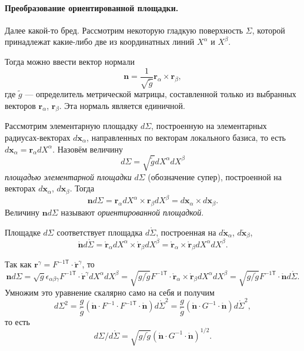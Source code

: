 \paragraph{Преобразование ориентированной площадки.} Далее какой-то бред.
Рассмотрим некоторую гладкую поверхность $ \Sigma $, которой принадлежат
какие-либо две из координатных линий $ X^\alpha $ и $ X^\beta $.

Тогда можно ввести вектор нормали  
\[
  \mathbf{n} = \frac{1}{\sqrt{\tilde{g}}} \mathbf{r}_\alpha \times
  \mathbf{r}_\beta,
\]
где $ \tilde g $ --- определитель метрической матрицы, составленной только из
выбранных векторов $ \mathbf{r}_\alpha $, $ \mathbf{r}_\beta $. Эта нормаль
является единичной.

Рассмотрим элементарную площадку $ d\Sigma $, построенную на элементарных
радиусах-векторах $ d\mathbf{x}_\alpha $, направленных по векторам локального
базиса, то есть $ d\mathbf{x}_\alpha = \mathbf{r}_\alpha dX^\alpha $. Назовём
величину  
\[
  d\Sigma = \sqrt{\tilde g} dX^\alpha dX^\beta
\]
\emph{площадью элементарной площадки} $ d\Sigma $ (обозначение супер),
построенной на векторах $ d\mathbf{x}_\alpha $, $ d\mathbf{x}_\beta $. Тогда  
\[
  \mathbf{n} d\Sigma = \mathbf{r}_\alpha dX^\alpha \times \mathbf{r}_\beta
  dX^\beta = d\mathbf{x}_\alpha \times d\mathbf{x}_\beta.
\]
Величину $ \mathbf{n}d\Sigma $ называют \emph{ориентированной площадкой}.

Площадке $ d\Sigma $ соответствует площадка $ d\mathring{\Sigma} $, построенная
на $ d\mathring{\mathbf{x}}_\alpha $, $ d\mathring{\mathbf{x}}_\beta$, 
\[
  \mathring{\mathbf{n}}d\mathring{\Sigma} = \mathring{\mathbf{r}}_\alpha
  dX^\alpha \times \mathring{\mathbf{r}}_\beta dX^\beta =
  \mathring{\mathbf{r}}_\alpha \times \mathring{\mathbf{r}}_\beta dX^\alpha
  dX^\beta.
\]

Так как $ \mathbf{r}^\gamma = F^{-1\mathsf T}\cdot \mathring{\mathbf{r}}^\gamma
$, то  
\begin{equation}\label{eq:govno}
  \mathbf{n}d\Sigma = \sqrt{g}\epsilon_{\alpha\beta\gamma}F^{-1\mathsf T} \cdot
  \mathring{\mathbf{r}}^\gamma dX^\alpha dX^\beta =
  \sqrt{g/\mathring{g}} F^{-1 \mathsf T}\cdot
  \mathring{\mathbf{r}}_\alpha\times\mathring{\mathbf{r}}_\beta dX^\alpha
  dX^\beta = 
  \sqrt{g/\mathring{g}} F^{-1\mathsf
  T}\cdot \mathring{\mathbf{n}}d\mathring{\Sigma}.
\end{equation}
Умножим это уравнение скалярно само на себя и получим  
\[
  d\Sigma^2 = \frac{g}{\mathring{g}}(\mathring{\mathbf{n}}\cdot F^{-1}\cdot
  F^{-1\mathsf T}\cdot \mathring{\mathbf{n}})d\mathring{\Sigma}^2 =
  \frac{g}{\mathring g}(\mathring{\mathbf{n}}\cdot G^{-1}\cdot
  \mathring{\mathbf{n}})d\mathring{\Sigma}^2,
\]
то есть 
\[
  d\Sigma/d\mathring{\Sigma} = \sqrt{g/\mathring{g}}(\mathring{\mathbf{n}}\cdot
  G^{-1}\cdot \mathring{\mathbf{n}})^{1/2}.
\]

